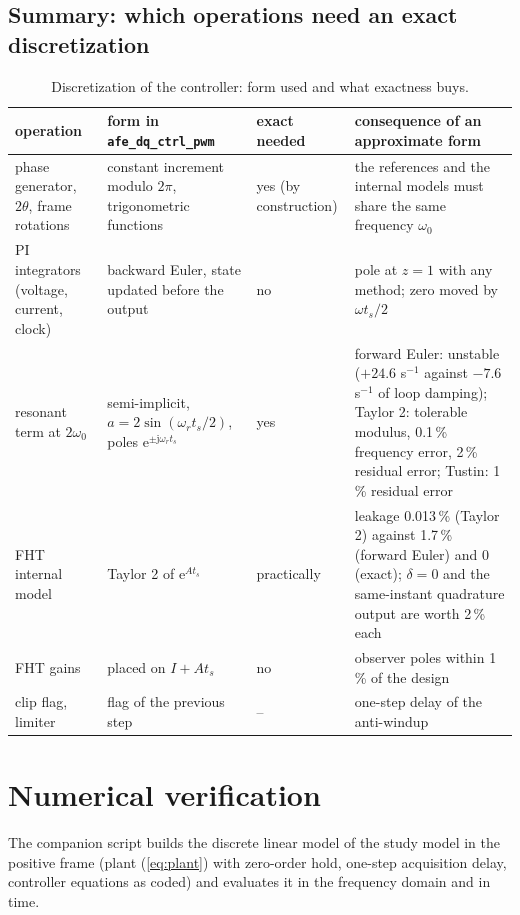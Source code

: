 \documentclass[10pt,a4paper]{scrartcl}
\newcommand{\ts}{t_s}
\newcommand{\wo}{\omega_0}
\newcommand{\wres}{\omega_r}
\newcommand{\jj}{\mathrm{j}}
\newcommand{\ee}{\mathrm{e}}
\newcommand{\code}[1]{\texttt{#1}}
\begin{document}
\begin{onehalfspace}
\subsection{Summary: which operations need an exact discretization}

\begin{table}[htb]
\centering\small
\caption{Discretization of the controller: form used and what exactness buys.}
\label{tab:summary}
\begin{tabular}{@{}R{3.2cm}R{4.2cm}R{1.6cm}R{6.6cm}@{}}
\toprule
operation & form in \code{afe\_dq\_ctrl\_pwm} & exact needed & consequence of an approximate form \\
\midrule
phase generator, $2\theta$, frame rotations & constant increment modulo $2\pi$, trigonometric functions & yes (by construction) & the references and the internal models must share the same frequency $\wo$ \\
PI integrators (voltage, current, clock) & backward Euler, state updated before the output & no & pole at $z = 1$ with any method; zero moved by $\omega\ts/2$ \\
resonant term at $2\wo$ & semi-implicit, $a = 2\sin(\wres\ts/2)$, poles $\ee^{\pm\jj\wres\ts}$ & yes & forward Euler: unstable ($+24.6$ s$^{-1}$ against $-7.6$ s$^{-1}$ of loop damping); Taylor 2: tolerable modulus, 0.1\,\% frequency error, 2\,\% residual error; Tustin: 1\,\% residual error \\
FHT internal model & Taylor 2 of $\ee^{A\ts}$ & practically & leakage 0.013\,\% (Taylor 2) against 1.7\,\% (forward Euler) and 0 (exact); $\delta = 0$ and the same-instant quadrature output are worth 2\,\% each \\
FHT gains & placed on $I + A\ts$ & no & observer poles within 1\,\% of the design \\
clip flag, limiter & flag of the previous step & -- & one-step delay of the anti-windup \\
\bottomrule
\end{tabular}
\end{table}

\section{Numerical verification}
\label{sec:verification}

The companion script builds the discrete linear model of the study model in the positive frame (plant (\ref{eq:plant}) with zero-order hold, one-step acquisition delay, controller equations as coded) and evaluates it in the frequency domain and in time.


\end{onehalfspace}
\end{document}
